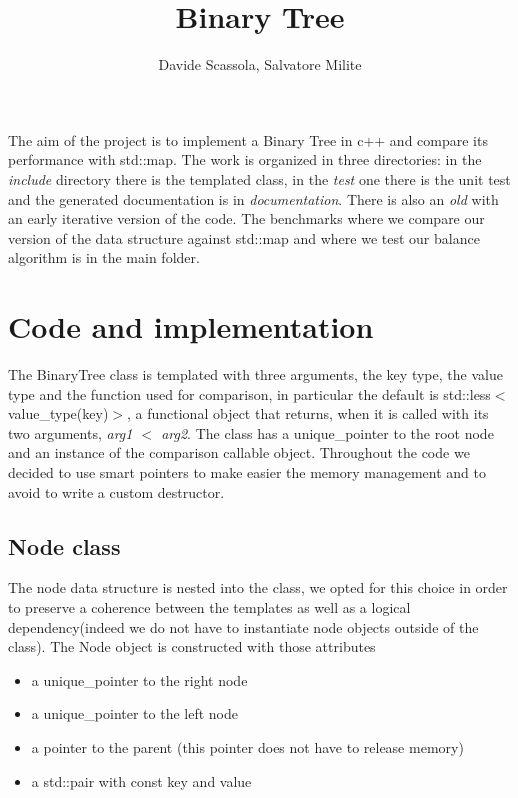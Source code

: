 \documentclass[a4paper,11pt]{article}
\title{Binary Tree}
\author{Davide Scassola, Salvatore Milite}
\begin{document}
\maketitle

The aim of the project is to implement a Binary Tree in c++ and compare its performance with std::map. The work is organized in three directories: in the \emph{include} directory there is the templated class, in the \emph{test} one there is the unit test and the generated documentation is in \emph{documentation}. There is also an \emph{old} with an early iterative version of the code. The benchmarks where we compare our version of the data structure against std::map and where we test our balance algorithm is in the main folder.  


\section*{Code and implementation}

The BinaryTree class is templated with three arguments, the key type, the value type and the function used for comparison, in particular the default is std::less$<$value\_type(key)$>$, a functional object that returns, when it is called with its two arguments, \emph{arg1 $<$ arg2}. The class has a unique\_pointer to the root node and an instance of the comparison callable object. Throughout the code we decided to use smart pointers to make easier the memory management and to avoid to write a custom destructor.  

\subsection*{Node class}

The node data structure is nested into the class, we opted for this choice in order to preserve a coherence between the templates as well as a logical dependency(indeed we do not have to instantiate node objects outside of the class). The Node object is constructed with those attributes 

\begin{itemize}
\item a unique\_pointer to the right node

\item a unique\_pointer to the left node

\item a pointer to the parent (this pointer does not have to release memory)

\item a std::pair with const key and value
\end{itemize}
\end{document}
